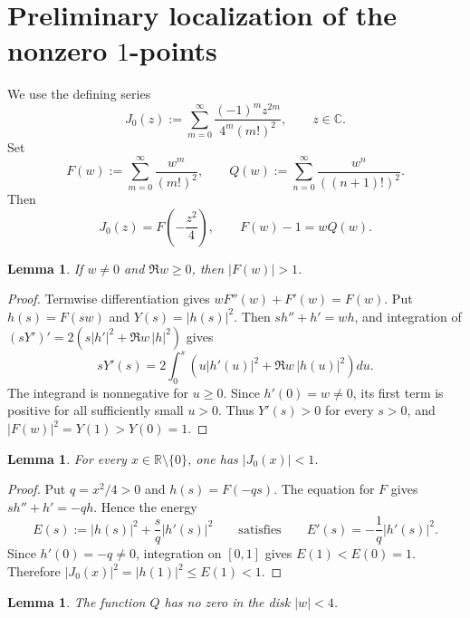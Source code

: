 \documentclass[11pt]{amsart}
\numberwithin{equation}{section}
\newtheorem{lemma}[theorem]{Lemma}
\theoremstyle{definition}
\theoremstyle{remark}
\newcommand{\C}{\mathbb C}
\newcommand{\R}{\mathbb R}
\begin{document}
\section{Preliminary localization of the nonzero \texorpdfstring{$1$}{1}-points}
\label{sec:localization}

We use the defining series
\begin{equation*}
   J_0(z):=\sum_{m=0}^{\infty}\frac{(-1)^m z^{2m}}{4^m(m!)^2},
   \qquad z\in\C.
\end{equation*}
Set
\[
   F(w):=\sum_{m=0}^{\infty}\frac{w^m}{(m!)^2},
   \qquad
   Q(w):=\sum_{n=0}^{\infty}\frac{w^n}{((n+1)!)^2}.
\]
Then
\begin{equation}\label{eq:J0-FQ-relations}
   J_0(z)=F\!\left(-\frac{z^2}{4}\right),
   \qquad
   F(w)-1=wQ(w).
\end{equation}

\begin{lemma}\label{lem:F-right-half-plane}
If $w\ne0$ and $\Re w\ge0$, then $|F(w)|>1$.
\end{lemma}

\begin{proof}
Termwise differentiation gives $wF''(w)+F'(w)=F(w)$.  Put
$h(s)=F(sw)$ and $Y(s)=|h(s)|^2$.  Then $sh''+h'=wh$, and integration of
$(sY')'=2(s|h'|^2+\Re w\,|h|^2)$ gives
\begin{equation}\label{eq:F-energy-identity}
   sY'(s)=2\int_0^s
   \left(u|h'(u)|^2+\Re w\,|h(u)|^2\right)du.
\end{equation}
The integrand is nonnegative for $u\ge0$.  Since $h'(0)=w\ne0$, its first
term is positive for all sufficiently small $u>0$.  Thus $Y'(s)>0$ for
every $s>0$, and $|F(w)|^2=Y(1)>Y(0)=1$.
\end{proof}

\begin{lemma}\label{lem:no-real-one-points}
For every $x\in\R\setminus\{0\}$, one has $|J_0(x)|<1$.
\end{lemma}

\begin{proof}
Put $q=x^2/4>0$ and $h(s)=F(-qs)$.  The equation for $F$ gives
$sh''+h'=-qh$.  Hence the energy
\[
   E(s):=|h(s)|^2+\frac{s}{q}|h'(s)|^2
   \qquad\text{satisfies}\qquad
   E'(s)=-\frac1q|h'(s)|^2.
\]
Since $h'(0)=-q\ne0$, integration on $[0,1]$ gives $E(1)<E(0)=1$.
Therefore $|J_0(x)|^2=|h(1)|^2\le E(1)<1$.
\end{proof}

\begin{lemma}\label{lem:Q-zero-free}
The function $Q$ has no zero in the disk $|w|<4$.
\end{lemma}
\end{document}
